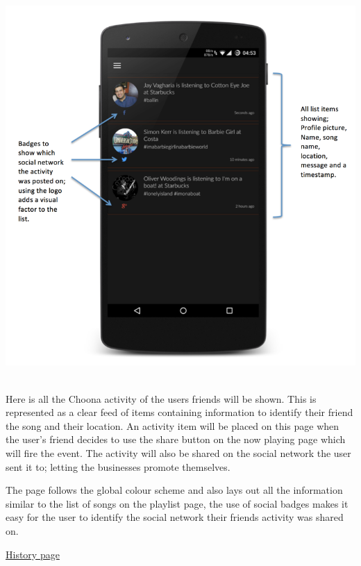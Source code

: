 \noindent
\begin{minipage}{\linewidth}
\centering
\includegraphics[scale=1]{./img/activityannotated.png}
\label{fig:activitypage}
\end{minipage}\\

Here is all the Choona activity of the users friends will be shown. This is represented as a clear feed of items containing information to identify their friend the song and their location. An activity item will be placed on this page when the user's friend decides to use the share button on the now playing page which will fire the event. The activity will also be shared on the social network the user sent it to; letting the businesses promote themselves. 

The page follows the global colour scheme and also lays out all the information similar to the list of songs on the playlist page, the use of social badges makes it easy for the user to identify the social network their friends activity was shared on. 
\newpage

\noindent\underline{History page}\newline

